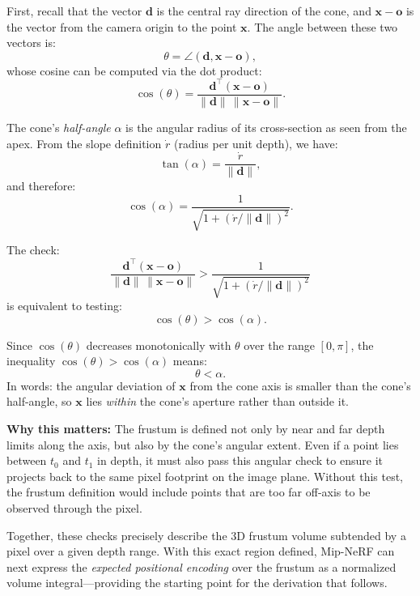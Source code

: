 \begin{enrichment}
\begin{enrichment}
\begin{itemize}
        First, recall that the vector $\mathbf{d}$ is the central ray direction of the cone, and $\mathbf{x} - \mathbf{o}$ is the vector from the camera origin to the point $\mathbf{x}$.  
        The angle between these two vectors is:
        \[
        \theta = \angle(\mathbf{d}, \mathbf{x} - \mathbf{o}),
        \]
        whose cosine can be computed via the dot product:
        \[
        \cos(\theta) 
        = \frac{\mathbf{d}^\top (\mathbf{x} - \mathbf{o})}{\|\mathbf{d}\| \, \|\mathbf{x} - \mathbf{o}\|}.
        \]
        
        The cone’s \emph{half-angle} $\alpha$ is the angular radius of its cross-section as seen from the apex.  
        From the slope definition $\dot{r}$ (radius per unit depth), we have:
        \[
        \tan(\alpha) = \frac{\dot{r}}{\|\mathbf{d}\|},
        \]
        and therefore:
        \[
        \cos(\alpha) = \frac{1}{\sqrt{1 + (\dot{r} / \|\mathbf{d}\|)^2}}.
        \]
        
        The check:
        \[
        \frac{\mathbf{d}^\top (\mathbf{x} - \mathbf{o})}{\|\mathbf{d}\| \, \|\mathbf{x} - \mathbf{o}\|} > \frac{1}{\sqrt{1 + (\dot{r} / \|\mathbf{d}\|)^2}}
        \]
        is equivalent to testing:
        \[
        \cos(\theta) > \cos(\alpha).
        \]
        
        Since $\cos(\theta)$ decreases monotonically with $\theta$ over the range $[0, \pi]$, the inequality $\cos(\theta) > \cos(\alpha)$ means:
        \[
        \theta < \alpha.
        \]
        In words: the angular deviation of $\mathbf{x}$ from the cone axis is smaller than the cone’s half-angle, so $\mathbf{x}$ lies \emph{within} the cone’s aperture rather than outside it.
        
        \textbf{Why this matters:}  
        The frustum is defined not only by near and far depth limits along the axis, but also by the cone’s angular extent.  
        Even if a point lies between $t_0$ and $t_1$ in depth, it must also pass this angular check to ensure it projects back to the same pixel footprint on the image plane.  
        Without this test, the frustum definition would include points that are too far off-axis to be observed through the pixel.
        
    \end{itemize}
    
    Together, these checks precisely describe the 3D frustum volume subtended by a pixel over a given depth range. With this exact region defined, Mip-NeRF can next express the \emph{expected positional encoding} over the frustum as a normalized volume integral—providing the starting point for the derivation that follows.
    

\end{enrichment}
\end{enrichment}
